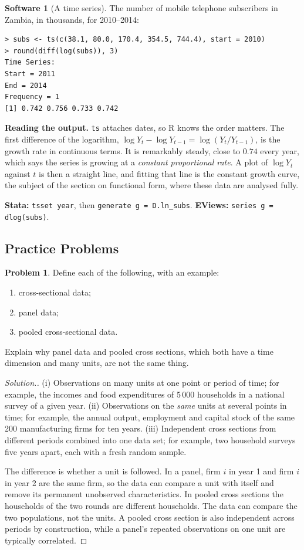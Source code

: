 \documentclass[11pt,a4paper]{article}
\numberwithin{equation}{section}
\theoremstyle{definition}
\newtheorem{software}[thm]{Software}
\newtheorem{problemx}{Problem}[subsection]
\newenvironment{problem}{\begin{problemx}}{\end{problemx}}
\newenvironment{solution}
  {\renewcommand{\qedsymbol}{}\begin{proof}[\textit{Solution}.]}
  {\end{proof}}
\begin{document}
\begin{software}[A time series]
\label{sw:ts}
The number of mobile telephone subscribers in Zambia, in thousands, for 2010--2014:
{\small\begin{verbatim}
> subs <- ts(c(38.1, 80.0, 170.4, 354.5, 744.4), start = 2010)
> round(diff(log(subs)), 3)
Time Series:
Start = 2011
End = 2014
Frequency = 1
[1] 0.742 0.756 0.733 0.742
\end{verbatim}}
\textbf{Reading the output.} \texttt{ts} attaches dates, so R knows the order matters. The first difference of the logarithm,
$\log Y_t - \log Y_{t-1} = \log(Y_t/Y_{t-1})$, is the growth rate in continuous terms. It is remarkably steady, close to $0.74$ every year,
which says the series is growing at a \emph{constant proportional rate}. A plot of $\log Y_t$ against $t$ is then a straight line, and fitting
that line is the constant growth curve, the subject of the section on functional form, where these data
are analysed fully.

\textbf{Stata:} \texttt{tsset year}, then \texttt{generate g = D.ln\_subs}. \textbf{EViews:} \texttt{series g = dlog(subs)}.
\end{software}

\subsection{Practice Problems}

\begin{problem}
Define each of the following, with an example:
\begin{enumerate}[label=(\roman*)]
\item cross-sectional data;
\item panel data;
\item pooled cross-sectional data.
\end{enumerate}
Explain why panel data and pooled cross sections, which both have a time dimension and many units, are not the same thing.
\end{problem}

\begin{solution}
(i) Observations on many units at one point or period of time; for example, the incomes and food expenditures of 5\,000 households in a
national survey of a given year. (ii) Observations on the \emph{same} units at several points in time; for example, the annual output, employment
and capital stock of the same 200 manufacturing firms for ten years. (iii) Independent cross sections from different periods combined into one
data set; for example, two household surveys five years apart, each with a fresh random sample.

The difference is whether a unit is followed. In a panel, firm $i$ in year 1 and firm $i$ in year 2 are the same firm, so the data can compare a
unit with itself and remove its permanent unobserved characteristics. In pooled cross sections the households of the two rounds are different
households. The data can compare the two populations, not the units. A pooled cross section is also independent across periods by
construction, while a panel's repeated observations on one unit are typically correlated.
\end{solution}
\end{document}
